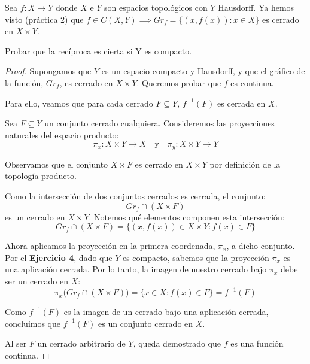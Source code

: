 \documentclass{article}
\theoremstyle{plain}
\theoremstyle{definition}
\newenvironment{ejercicio}[1]{\begin{trivlist}
\item[\hskip \labelsep {\bfseries Ejercicio}\hskip \labelsep {\bfseries #1.}]}{\end{trivlist}}
\begin{document}
\begin{ejercicio}{5}
    Sea \( f : X \to Y \) donde \( X \) e \( Y \) son espacios topológicos con \( Y \) Hausdorff. Ya hemos visto (práctica 2) que \( f \in C(X,Y) \implies Gr_f = \{ (x, f(x)) : x \in X\} \) es cerrado en \( X \times Y \).

    Probar que la recíproca es cierta si Y es compacto.
\end{ejercicio}
\begin{proof}
    Supongamos que \( Y \) es un espacio compacto y Hausdorff, y que el gráfico de la función, \( Gr_f \), es cerrado en \( X \times Y \).
    Queremos probar que \( f \) es continua.

    Para ello, veamos que para cada cerrado \( F \subseteq Y \), \( f^{-1}(F) \) es cerrada en \( X \).

    Sea \( F \subseteq Y \) un conjunto cerrado cualquiera. Consideremos las proyecciones naturales del espacio producto:
    \[ \pi_x : X \times Y \longrightarrow X \quad \text{y} \quad \pi_y : X \times Y \longrightarrow Y \]

    Observamos que el conjunto \( X \times F \) es cerrado en \( X \times Y \) por definición de la topología producto.

    Como la intersección de dos conjuntos cerrados es cerrada, el conjunto:
    \[ Gr_f \cap (X \times F) \]
    es un cerrado en \( X \times Y \). Notemos qué elementos componen esta intersección:
    \[ Gr_f \cap (X \times F) = \{ (x, f(x)) \in X \times Y : f(x) \in F \} \]

    Ahora aplicamos la proyección en la primera coordenada, \( \pi_x \), a dicho conjunto.
    Por el \textbf{Ejercicio 4}, dado que \( Y \) es compacto, sabemos que la proyección \( \pi_x \) es una aplicación cerrada.
    Por lo tanto, la imagen de nuestro cerrado bajo \( \pi_x \) debe ser un cerrado en \( X \):
    \[ \pi_x \big( Gr_f \cap (X \times F) \big) = \{ x \in X : f(x) \in F \} = f^{-1}(F) \]

    Como \( f^{-1}(F) \) es la imagen de un cerrado bajo una aplicación cerrada, concluimos que \( f^{-1}(F) \) es un conjunto cerrado en \( X \).

    Al ser \( F \) un cerrado arbitrario de \( Y \), queda demostrado que \( f \) es una función continua.
\end{proof}
\end{document}
